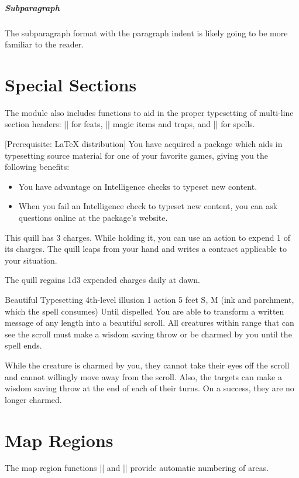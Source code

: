 \documentclass[letterpaper,twocolumn,openany,nodeprecatedcode]{dndbook}
\begin{document}
\subparagraph{Subparagraph}
The subparagraph format with the paragraph indent is likely going to be more familiar to the reader.

\section{Special Sections}
The module also includes functions to aid in the proper typesetting of multi-line section headers: |\DndFeatHeader| for feats, |\DndItemHeader| magic items and traps, and |\DndSpellHeader| for spells.

[Prerequisite: \LaTeX{} distribution]
You have acquired a package which aids in typesetting source material for one of your favorite games, giving you the following benefits:

\begin{itemize}
  \item You have advantage on Intelligence checks to typeset new content.
  \item When you fail an Intelligence check to typeset new content, you can ask questions online at the package's website.
\end{itemize}

This quill has 3 charges. While holding it, you can use an action to expend 1 of its charges. The quill leaps from your hand and writes a contract applicable to your situation.

The quill regains 1d3 expended charges daily at dawn.

\DndSpellHeader%
  {Beautiful Typesetting}
  {4th-level illusion}
  {1 action}
  {5 feet}
  {S, M (ink and parchment, which the spell consumes)}
  {Until dispelled}
You are able to transform a written message of any length into a beautiful scroll. All creatures within range that can see the scroll must make a wisdom saving throw or be charmed by you until the spell ends.

While the creature is charmed by you, they cannot take their eyes off the scroll and cannot willingly move away from the scroll. Also, the targets can make a wisdom saving throw at the end of each of their turns. On a success, they are no longer charmed.

\section{Map Regions}
The map region functions |\DndArea| and |\DndSubArea| provide automatic numbering of areas.
\end{document}
